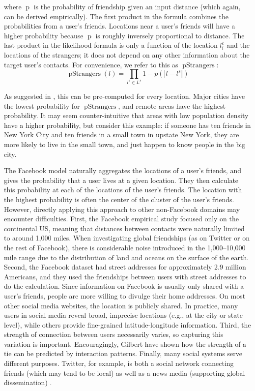 \documentclass[letterpaper]{article}
\DeclareMathOperator{\pStrangers}{pStrangers}
\DeclareMathOperator{\p}{p}
\begin{document}
\noindent where $\p$ is the probability of friendship given an input distance (which again, can be derived empirically).
%
The first product in the formula combines the probabilities from a user's friends.
%
Locations near a user's friends will have a higher probability because $\p$ is
roughly inversely proportional to distance.
%
The last product in the likelihood formula is only a function of the location $l^c_i$ and the locations of the strangers; it does not depend on any other information about the target user's contacts. For convenience, we refer to this as $\pStrangers$:
\[
    \pStrangers(l) = \prod_{l^s \in L^s}1-p(|l-l^s|)
\]

\noindent As suggested in \cite{backstrom2010find}, this can be pre-computed for every location.
Major cities have the lowest probability for $\pStrangers$, and remote areas have the highest probability.
It may seem counter-intuitive that areas with low population density have a
higher probability, but consider this example: if someone has ten friends in
New York City and ten friends in a small town in upstate New York, they are
more likely to live in the small town, and just happen to know people in the
big city.


The Facebook model naturally aggregates the locations of a user's friends, and
gives the probability that a user lives at a given location.
%
They then calculate this probability at each of the locations of the user's friends.
%
The location with the highest probability is often the center of the cluster of
the user's friends.
%
However, directly applying this approach to other non-Facebook domains may encounter difficulties.
%
First, the Facebook empirical study focused only on the continental US, meaning
that distances between contacts were naturally limited to around 1,000 miles.
%
When investigating global friendships (as on Twitter or on the rest of
Facebook), there is considerable noise introduced in the 1,000--10,000 mile
range due to the distribution of land and oceans on the surface of the earth.
%
Second, the Facebook dataset had street addresses for approximately 2.9 million
Americans, and they used the friendships between users with street addresses to
do the calculation.
%
Since information on Facebook is usually only shared with a user's friends,
people are more willing to divulge their home addresses.
%
On most other social media websites, the location is publicly shared.
%
In practice, many users in social media reveal broad, imprecise
locations (e.g., at the city or state level), while others provide fine-grained
latitude-longitude information.
%
Third, the strength of connection between users necessarily varies, so capturing this variation is important. Encouragingly, Gilbert \cite{gilbert2009predicting} have shown how the strength of a tie can be predicted by interaction patterns.  Finally, many social systems serve different purposes. Twitter, for example, is both a social network connecting friends (which may tend to be local) as well as a news media (supporting global dissemination)  \cite{kwak2010why}.
\end{document}

